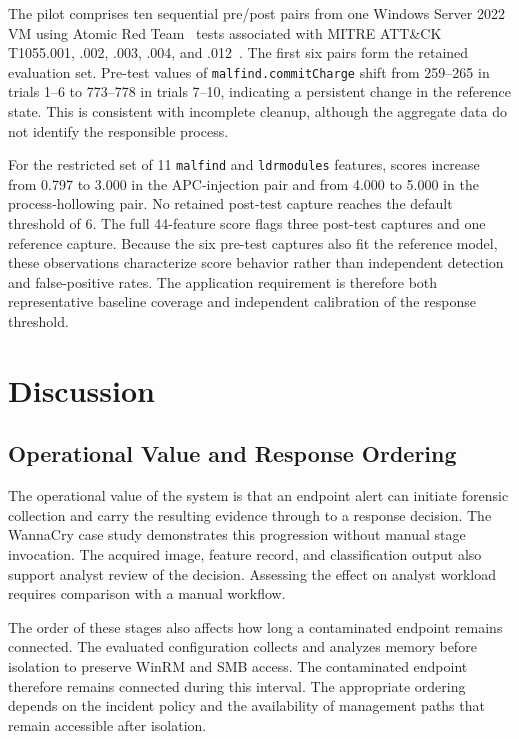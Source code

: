 \documentclass[conference]{IEEEtran}
\begin{document}
The pilot comprises ten sequential pre/post pairs from one Windows Server 2022 VM using Atomic Red Team~\cite{atomicredteam} tests associated with MITRE ATT\&CK T1055.001, .002, .003, .004, and .012~\cite{mitre1055}. The first six pairs form the retained evaluation set. Pre-test values of \texttt{malfind.commitCharge} shift from 259--265 in trials 1--6 to 773--778 in trials 7--10, indicating a persistent change in the reference state. This is consistent with incomplete cleanup, although the aggregate data do not identify the responsible process.

For the restricted set of 11 \texttt{malfind} and \texttt{ldrmodules} features, scores increase from 0.797 to 3.000 in the APC-injection pair and from 4.000 to 5.000 in the process-hollowing pair. No retained post-test capture reaches the default threshold of 6. The full 44-feature score flags three post-test captures and one reference capture. Because the six pre-test captures also fit the reference model, these observations characterize score behavior rather than independent detection and false-positive rates. The application requirement is therefore both representative baseline coverage and independent calibration of the response threshold.

\section{Discussion}
\label{sec:discussion}

\subsection{Operational Value and Response Ordering}
The operational value of the system is that an endpoint alert can initiate forensic collection and carry the resulting evidence through to a response decision. The WannaCry case study demonstrates this progression without manual stage invocation. The acquired image, feature record, and classification output also support analyst review of the decision. Assessing the effect on analyst workload requires comparison with a manual workflow.

The order of these stages also affects how long a contaminated endpoint remains connected. The evaluated configuration collects and analyzes memory before isolation to preserve WinRM and SMB access. The contaminated endpoint therefore remains connected during this interval. The appropriate ordering depends on the incident policy and the availability of management paths that remain accessible after isolation.
\end{document}
